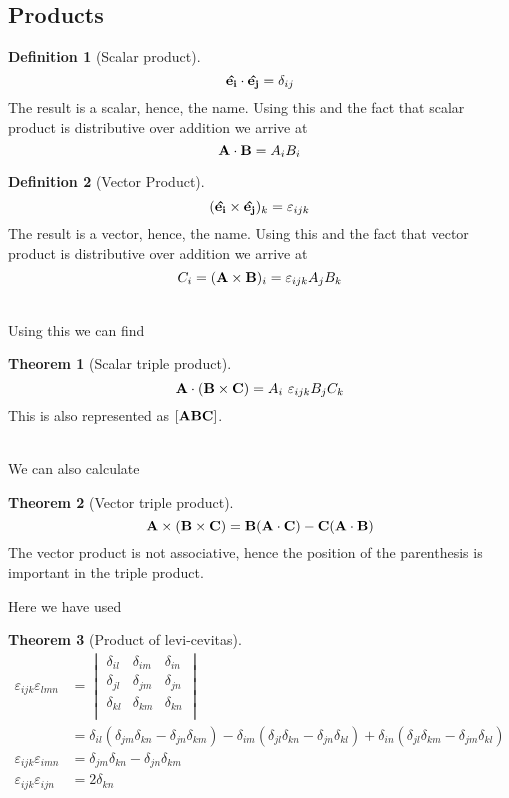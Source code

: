 \documentclass[10pt, a4paper]{extarticle}
\theoremstyle{definition}
\newtheorem{thm}{Theorem}
\newtheorem{defn}{Definition}
\begin{document}
\subsection{Products}
\begin{framed}
	\begin{defn}[Scalar product]
		\[\vu{e_i}\cdot\vu{e_j}=\delta_{ij}\]
		The result is a scalar, hence, the name. Using this and the fact that scalar product is distributive over addition we arrive at
		\[\vb{A}\cdot\vb{B}=A_iB_i\]
	\end{defn}
	\begin{defn}[Vector Product]
		\[(\vu{e_i}\times\vu{e_j})_k=\varepsilon_{ijk}\]
		The result is a vector, hence, the name. Using this and the fact that vector product is distributive over addition we arrive at
		\[C_i=(\vb{A}\times\vb{B})_i=\varepsilon_{ijk}A_jB_k\]
	\end{defn}
\end{framed}
\hfill\\
Using this we can find
\begin{framed}
	\begin{thm}[Scalar triple product]
		\[\vb{A}\cdot(\vb{B}\times\vb{C})=A_i\ \varepsilon_{ijk}B_jC_k\]
		This is also represented as $[\vb{ABC}]$.
	\end{thm}
\end{framed}
\hfill\\
We can also calculate
\begin{framed}
	\begin{thm}[Vector triple product]
		\[\vb{A}\times(\vb{B}\times\vb{C})=\vb{B}(\vb{A}\cdot\vb{C})-\vb{C}(\vb{A}\cdot\vb{B})\]
		The vector product is not associative, hence the position of the parenthesis is important in the triple product.
	\end{thm}
\end{framed}

Here we have used
\begin{thm}[Product of levi-cevitas]
	\begin{align*}
		\varepsilon_{ijk}\varepsilon_{lmn} & = \begin{vmatrix}
			\delta_{il} & \delta_{im} & \delta_{in} \\
			\delta_{jl} & \delta_{jm} & \delta_{jn} \\
			\delta_{kl} & \delta_{km} & \delta_{kn} \\
		\end{vmatrix}                                                                                                                                                                                                          \\[6pt]
		                                   & = \delta_{il}\left( \delta_{jm}\delta_{kn} - \delta_{jn}\delta_{km}\right) - \delta_{im}\left( \delta_{jl}\delta_{kn} - \delta_{jn}\delta_{kl} \right) + \delta_{in} \left( \delta_{jl}\delta_{km} - \delta_{jm}\delta_{kl} \right)\\
			\varepsilon_{ijk}\varepsilon_{imn} &= \delta_{jm}\delta_{kn} - \delta_{jn}\delta_{km}\\
			\varepsilon_{ijk}\varepsilon_{ijn} &= 2\delta_{kn}
	\end{align*}
\end{thm}
\end{document}
